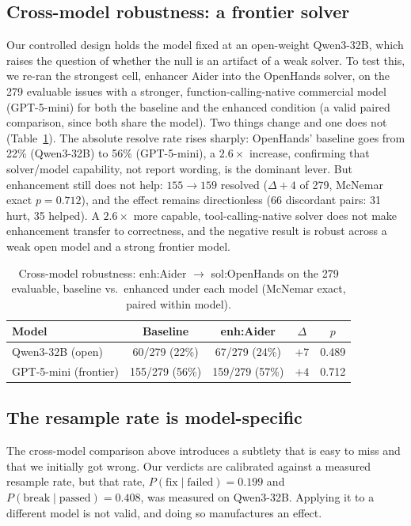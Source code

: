 \documentclass[journal]{IEEEtran}
\begin{document}
\subsection{Cross-model robustness: a frontier solver}
\label{sec:crossmodel}
Our controlled design holds the model fixed at an open-weight Qwen3-32B, which raises the question of whether the null is an artifact of a weak solver. To test this, we re-ran the strongest cell, enhancer Aider into the OpenHands solver, on the 279 evaluable issues with a stronger, function-calling-native commercial model (GPT-5-mini) for both the baseline and the enhanced condition (a valid paired comparison, since both share the model). Two things change and one does not (Table~\ref{tab:crossmodel}). The absolute resolve rate rises sharply: OpenHands' baseline goes from 22\% (Qwen3-32B) to 56\% (GPT-5-mini), a $2.6\times$ increase, confirming that solver/model capability, not report wording, is the dominant lever. But enhancement still does not help: $155 \rightarrow 159$ resolved ($\Delta{+}4$ of 279, McNemar exact $p=0.712$), and the effect remains directionless (66 discordant pairs: 31 hurt, 35 helped). A $2.6\times$ more capable, tool-calling-native solver does not make enhancement transfer to correctness, and the negative result is robust across a weak open model and a strong frontier model.

\begin{table}[t]
\centering
\caption{Cross-model robustness: enh:Aider $\rightarrow$ sol:OpenHands on the 279 evaluable, baseline vs.\ enhanced under each model (McNemar exact, paired within model).}
\label{tab:crossmodel}
\begin{tabular}{@{}lcccc@{}}
\toprule
Model & Baseline & enh:Aider & $\Delta$ & $p$ \\
\midrule
Qwen3-32B (open)      & 60/279 (22\%)  & 67/279 (24\%)  & $+7$ & 0.489 \\
GPT-5-mini (frontier) & 155/279 (56\%) & 159/279 (57\%) & $+4$ & 0.712 \\
\bottomrule
\end{tabular}
\end{table}

\subsection{The resample rate is model-specific}
\label{sec:ownresample}
The cross-model comparison above introduces a subtlety that is easy to miss and that we
initially got wrong. Our verdicts are calibrated against a measured resample rate, but that
rate, $P(\text{fix}\mid\text{failed})=0.199$ and $P(\text{break}\mid\text{passed})=0.408$, was
measured on Qwen3-32B. Applying it to a different model is not valid, and doing so manufactures
an effect.
\end{document}
